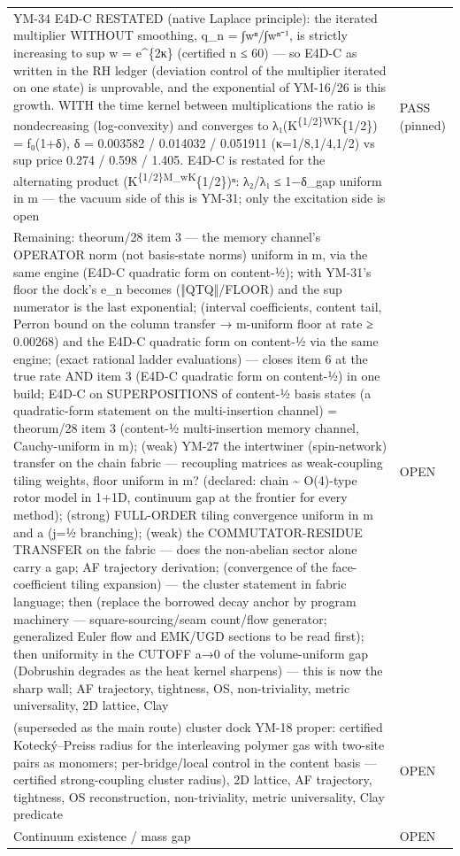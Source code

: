 \begin{longtable}[]{@{}
  >{\raggedright\arraybackslash}p{}
  >{\raggedright\arraybackslash}p{}@{}}
YM-34 E4D-C RESTATED (native Laplace principle): the iterated multiplier WITHOUT smoothing, q\_n = ∫wⁿ/∫wⁿ⁻¹, is strictly increasing to sup w = e\^{}\{2κ\} (certified n ≤ 60) --- so E4D-C as written in the RH ledger (deviation control of the multiplier iterated on one state) is unprovable, and the exponential of YM-16/26 is this growth. WITH the time kernel between multiplications the ratio is nondecreasing (log-convexity) and converges to λ₁(K\textsuperscript{\{1/2\}WK}\{1/2\}) = f₀(1+δ), δ = 0.003582 / 0.014032 / 0.051911 (κ=1/8,1/4,1/2) vs sup price 0.274 / 0.598 / 1.405. E4D-C is restated for the alternating product (K\textsuperscript{\{1/2\}M\_wK}\{1/2\})ⁿ: λ₂/λ₁ ≤ 1−δ\_gap uniform in m --- the vacuum side of this is YM-31; only the excitation side is open & PASS (pinned) \\
Remaining: theorum/28 item 3 --- the memory channel's OPERATOR norm (not basis-state norms) uniform in m, via the same engine (E4D-C quadratic form on content-½); with YM-31's floor the dock's e\_n becomes (‖QTQ‖/FLOOR) and the sup numerator is the last exponential; (interval coefficients, content tail, Perron bound on the column transfer → m-uniform floor at rate ≥ 0.00268) and the E4D-C quadratic form on content-½ via the same engine; (exact rational ladder evaluations) --- closes item 6 at the true rate AND item 3 (E4D-C quadratic form on content-½) in one build; E4D-C on SUPERPOSITIONS of content-½ basis states (a quadratic-form statement on the multi-insertion channel) = theorum/28 item 3 (content-½ multi-insertion memory channel, Cauchy-uniform in m); (weak) YM-27 the intertwiner (spin-network) transfer on the chain fabric --- recoupling matrices as weak-coupling tiling weights, floor uniform in m? (declared: chain \textasciitilde{} O(4)-type rotor model in 1+1D, continuum gap at the frontier for every method); (strong) FULL-ORDER tiling convergence uniform in m and a (j=½ branching); (weak) the COMMUTATOR-RESIDUE TRANSFER on the fabric --- does the non-abelian sector alone carry a gap; AF trajectory derivation; (convergence of the face-coefficient tiling expansion) --- the cluster statement in fabric language; then (replace the borrowed decay anchor by program machinery --- square-sourcing/seam count/flow generator; generalized Euler flow and EMK/UGD sections to be read first); then uniformity in the CUTOFF a→0 of the volume-uniform gap (Dobrushin degrades as the heat kernel sharpens) --- this is now the sharp wall; AF trajectory, tightness, OS, non-triviality, metric universality, 2D lattice, Clay & OPEN \\
(superseded as the main route) cluster dock YM-18 proper: certified Kotecký--Preiss radius for the interleaving polymer gas with two-site pairs as monomers; per-bridge/local control in the content basis --- certified strong-coupling cluster radius), 2D lattice, AF trajectory, tightness, OS reconstruction, non-triviality, metric universality, Clay predicate & OPEN \\
Continuum existence / mass gap & OPEN \\
\end{longtable}

